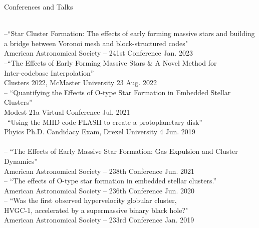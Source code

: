 \documentclass{resume} %
\newcommand{\forceindent}{\leavevmode{\parindent=1em\indent}}
\begin{document}
\begin{rSection}{Conferences and Talks}

\underline{}\\
--``Star Cluster Formation: The effects of early forming massive stars and building \\ \forceindent a bridge between Voronoi mesh and block-structured codes"\\
\forceindent American Astronomical Society -- 241st Conference \hfill Jan. 2023\\
--``The Effects of Early Forming Massive Stars \& A Novel Method for \\ \forceindent Inter-codebase Interpolation''\\
\forceindent Clusters 2022, McMaster University \hfill 23 Aug. 2022\\
-- ``Quantifying the Effects of O-type Star Formation in Embedded Stellar Clusters''\\
\forceindent Modest 21a Virtual Conference \hfill Jul. 2021\\
--``Using the MHD code FLASH to create a protoplanetary disk''\\
\forceindent Phyics Ph.D. Candidacy Exam, Drexel University \hfill 4 Jun. 2019\\

\underline{}\\
-- ``The Effects of Early Massive Star Formation: Gas Expulsion and Cluster Dynamics''\\
\forceindent American Astronomical Society -- 238th Conference \hfill Jun. 2021\\
-- ``The effects of O-type star formation in embedded stellar clusters.''\\
\forceindent American Astronomical Society -- 236th Conference \hfill Jun. 2020\\
-- ``Was the first observed hypervelocity globular cluster, \\ \forceindent HVGC-1, accelerated by a supermassive binary black hole?"\\
\forceindent American Astronomical Society -- 233rd Conference \hfill Jan. 2019

\end{rSection}
\end{document}
